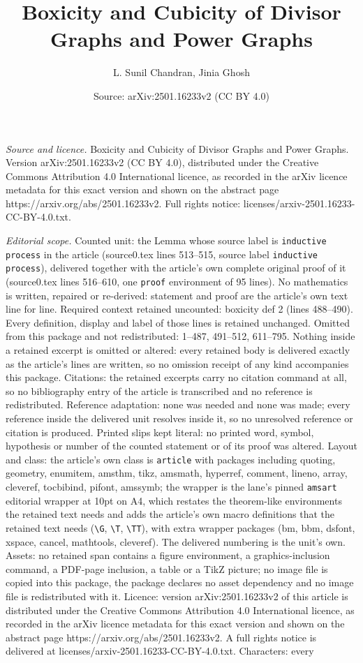 \documentclass[10pt,a4paper]{amsart}
\title[Boxicity and Cubicity of Divisor Graphs and Power Graphs]{Boxicity and Cubicity of Divisor Graphs and Power Graphs}
\author{L. Sunil Chandran, Jinia Ghosh}
\date{Source: arXiv:2501.16233v2 (CC BY 4.0)}
\begin{document}
\maketitle

\noindent\emph{Source and licence.} Boxicity and Cubicity of Divisor Graphs and Power Graphs. Version arXiv:2501.16233v2 (CC BY 4.0), distributed under the Creative Commons Attribution 4.0 International licence, as recorded in the arXiv licence metadata for this exact version and shown on the abstract page https://arxiv.org/abs/2501.16233v2. Full rights notice: licenses/arxiv-2501.16233-CC-BY-4.0.txt.\par\smallskip

\noindent\textit{Editorial scope.} Counted unit: the Lemma whose source label is \texttt{inductive process} in the article (source0.tex lines 513--515, source label \texttt{inductive process}), delivered together with the article's own complete original proof of it (source0.tex lines 516--610, one \texttt{proof} environment of 95 lines). No mathematics is written, repaired or re-derived: statement and proof are the article's own text line for line. Required context retained uncounted: boxicity def 2 (lines 488--490). Every definition, display and label of those lines is retained unchanged. Omitted from this package and not redistributed: 1--487, 491--512, 611--795. Nothing inside a retained excerpt is omitted or altered: every retained body is delivered exactly as the article's lines are written, so no omission receipt of any kind accompanies this package. Citations: the retained excerpts carry no citation command at all, so no bibliography entry of the article is transcribed and no reference is redistributed. Reference adaptation: none was needed and none was made; every reference inside the delivered unit resolves inside it, so no unresolved reference or citation is produced. Printed slips kept literal: no printed word, symbol, hypothesis or number of the counted statement or of its proof was altered. Layout and class: the article's own class is \texttt{article} with packages including quoting, geometry, enumitem, amsthm, tikz, amsmath, hyperref, comment, lineno, array, cleveref, tocbibind, pifont, amssymb; the wrapper is the lane's pinned \texttt{amsart} editorial wrapper at 10pt on A4, which restates the theorem-like environments the retained text needs and adds the article's own macro definitions that the retained text needs (\texttt{\textbackslash G}, \texttt{\textbackslash T}, \texttt{\textbackslash TT}), with extra wrapper packages (bm, bbm, dsfont, xspace, cancel, mathtools, cleveref). The delivered numbering is the unit's own. Assets: no retained span contains a figure environment, a graphics-inclusion command, a PDF-page inclusion, a table or a TikZ picture; no image file is copied into this package, the package declares no asset dependency and no image file is redistributed with it. Licence: version arXiv:2501.16233v2 of this article is distributed under the Creative Commons Attribution 4.0 International licence, as recorded in the arXiv licence metadata for this exact version and shown on the abstract page https://arxiv.org/abs/2501.16233v2. A full rights notice is delivered at licenses/arxiv-2501.16233-CC-BY-4.0.txt. Characters: every 
\end{document}
